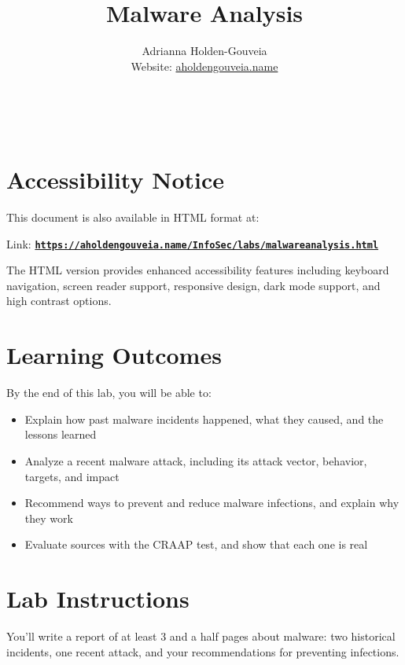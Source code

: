 \documentclass[12pt]{article}
\title{Malware Analysis}
\author{
        Adrianna Holden-Gouveia \\
        Website: \href{https://aholdengouveia.name}{aholdengouveia.name}\\ 
        \date{\vspace{-5ex}}
        \faGithub {: aholdengouveia} \\
        \faTwitter {: aholdengouveia} \\
        }
\begin{document}
    

\maketitle

\section*{Accessibility Notice}
This document is also available in HTML format at:

Link: \href{https://aholdengouveia.name/InfoSec/labs/malwareanalysis.html}{\textbf{\nolinkurl{https://aholdengouveia.name/InfoSec/labs/malwareanalysis.html}}}

The HTML version provides enhanced accessibility features including keyboard navigation, screen reader support, responsive design, dark mode support, and high contrast options.



\section*{Learning Outcomes}
By the end of this lab, you will be able to:
\begin{itemize}
    \item Explain how past malware incidents happened, what they caused, and the lessons learned
    \item Analyze a recent malware attack, including its attack vector, behavior, targets, and impact
    \item Recommend ways to prevent and reduce malware infections, and explain why they work
    \item Evaluate sources with the CRAAP test, and show that each one is real
\end{itemize}

\section*{Lab Instructions}
You'll write a report of at least 3 and a half pages about malware: two historical incidents, one recent attack, and your recommendations for preventing infections.
\end{document}
